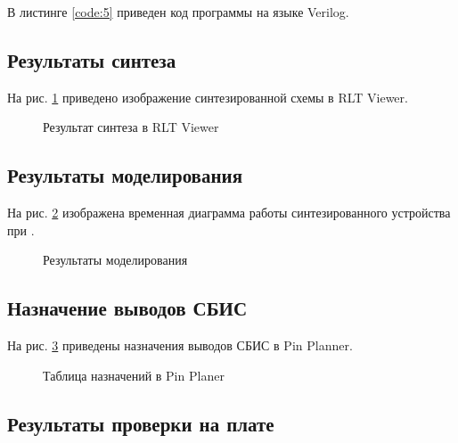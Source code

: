 В листинге \ref{code:5} приведен код программы на языке Verilog.

%

\subsection{Результаты синтеза}

На рис. \ref{fig:elab6_1_rtl} приведено изображение синтезированной схемы в RLT Viewer.

\begin{figure}[H]
\begin{center}
	\caption{Результат синтеза в RLT Viewer}
	\label{fig:elab6_1_rtl}
\end{center}
\end{figure}

\subsection{Результаты моделирования}
\label{sec:elab6_1_modeling}

На рис. \ref{fig:elab6_1_modeling} изображена временная диаграмма работы синтезированного устройства при .

\begin{figure}[H]
\begin{center}
	\caption{Результаты моделирования}
	\label{fig:elab6_1_modeling}
\end{center}
\end{figure}

\subsection{Назначение выводов СБИС}

На рис. \ref{fig:elab6_1_pins} приведены назначения выводов СБИС в Pin Planner.

\begin{figure}[H]
\begin{center}
	\caption{Таблица назначений в Pin Planer}
	\label{fig:elab6_1_pins}
\end{center}
\end{figure}

\subsection{Результаты проверки на плате}

